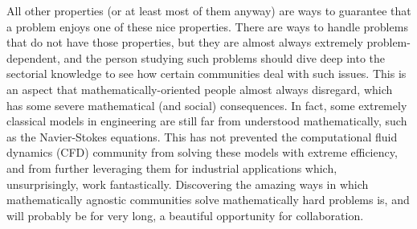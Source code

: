 All other properties (or at least most of them anyway) are ways to guarantee that a problem enjoys one of these nice properties. There are ways to handle problems that do not have those properties, but they are almost always extremely problem-dependent, and the person studying such problems should dive deep into the sectorial knowledge to see how certain communities deal with such issues. This is an aspect that mathematically-oriented people almost always disregard, which has some severe mathematical (and social) consequences. In fact, some extremely classical models in engineering are still far from understood mathematically, such as the Navier-Stokes equations. This has not prevented the computational fluid dynamics (CFD) community from solving these models with extreme efficiency, and from further leveraging them for industrial applications which, unsurprisingly, work fantastically. Discovering the amazing ways in which mathematically agnostic communities solve mathematically hard problems is, and will probably be for very long, a beautiful opportunity for collaboration.


